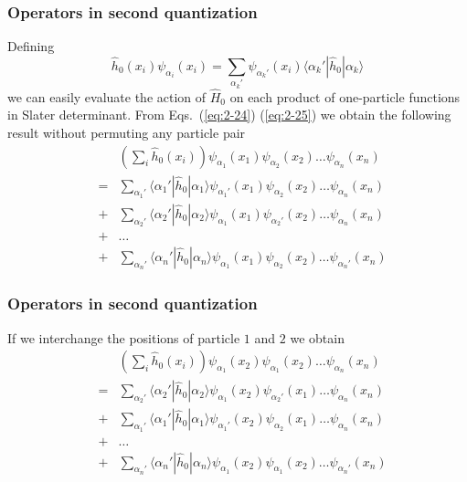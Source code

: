 \documentclass[compress]{beamer}
\newcommand*{\ket}[1]{|#1\rangle}
\newcommand*{\bra}[1]{\langle#1|}
\newcommand{\element}[3]
        {\bra{#1}#2\ket{#3}}
\begin{document}
\frame
{
  \frametitle{Operators in second quantization}
\begin{small}
{\scriptsize
Defining
\begin{equation}
	\hat{h}_0(x_i) \psi_{\alpha_i}(x_i) = \sum_{\alpha_k'} \psi_{\alpha_k'}(x_i) \element{\alpha_k'}{\hat{h}_0}{\alpha_k} \label{eq:2-25}
\end{equation}
we can easily  evaluate the action of $\hat{H}_0$ on each product of one-particle functions in Slater determinant.
From Eqs.~(\ref{eq:2-24}) 
(\ref{eq:2-25})  we obtain the following result without  permuting any particle pair 
\begin{eqnarray}
	&& \left( \sum_i \hat{h}_0(x_i) \right) \psi_{\alpha_1}(x_1)\psi_{\alpha_2}(x_2) \dots \psi_{\alpha_n}(x_n) \nonumber \\
	& =&\sum_{\alpha_1'} \element{\alpha_1'}{\hat{h}_0}{\alpha_1} 
		\psi_{\alpha_1'}(x_1)\psi_{\alpha_2}(x_2) \dots \psi_{\alpha_n}(x_n) \nonumber \\
	&+&\sum_{\alpha_2'} \element{\alpha_2'}{\hat{h}_0}{\alpha_2} 
		\psi_{\alpha_1}(x_1)\psi_{\alpha_2'}(x_2) \dots \psi_{\alpha_n}(x_n) \nonumber \\
	&+& \dots \nonumber \\
	&+&\sum_{\alpha_n'} \element{\alpha_n'}{\hat{h}_0}{\alpha_n} 
		\psi_{\alpha_1}(x_1)\psi_{\alpha_2}(x_2) \dots \psi_{\alpha_n'}(x_n) \label{eq:2-26}
\end{eqnarray}
}
\end{small}
}


\frame
{
  \frametitle{Operators in second quantization}
\begin{small}
{\scriptsize
If we interchange the positions of particle $1$ and $2$  we obtain
\begin{eqnarray}
	&& \left( \sum_i \hat{h}_0(x_i) \right) \psi_{\alpha_1}(x_2)\psi_{\alpha_1}(x_2) \dots \psi_{\alpha_n}(x_n) \nonumber \\
	& =&\sum_{\alpha_2'} \element{\alpha_2'}{\hat{h}_0}{\alpha_2} 
		\psi_{\alpha_1}(x_2)\psi_{\alpha_2'}(x_1) \dots \psi_{\alpha_n}(x_n) \nonumber \\
	&+&\sum_{\alpha_1'} \element{\alpha_1'}{\hat{h}_0}{\alpha_1} 
		\psi_{\alpha_1'}(x_2)\psi_{\alpha_2}(x_1) \dots \psi_{\alpha_n}(x_n) \nonumber \\
	&+& \dots \nonumber \\
	&+&\sum_{\alpha_n'} \element{\alpha_n'}{\hat{h}_0}{\alpha_n} 
		\psi_{\alpha_1}(x_2)\psi_{\alpha_1}(x_2) \dots \psi_{\alpha_n'}(x_n) \label{eq:2-27}
\end{eqnarray}
}
\end{small}
}
\end{document}
